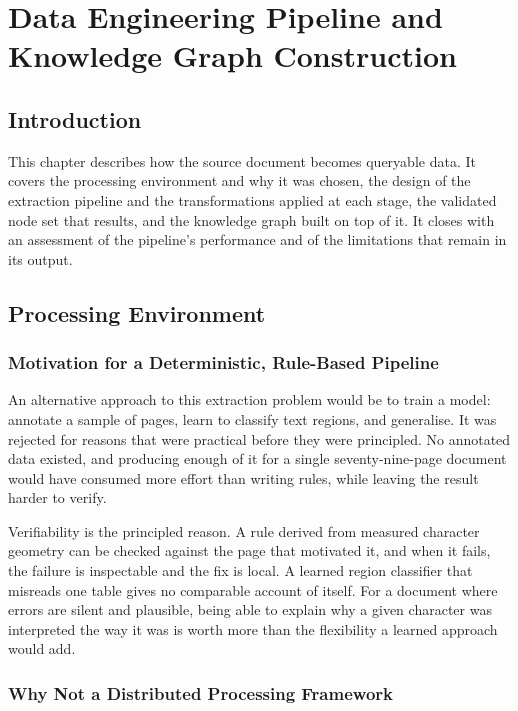 \chapter{Data Engineering Pipeline and Knowledge Graph Construction}
\minitoc

\section*{Introduction}

This chapter describes how the source document becomes queryable data. It covers the processing environment and why it was chosen, the design of the extraction pipeline and the transformations applied at each stage, the validated node set that results, and the knowledge graph built on top of it. It closes with an assessment of the pipeline's performance and of the limitations that remain in its output.

\section{Processing Environment}

\subsection{Motivation for a Deterministic, Rule-Based Pipeline}

An alternative approach to this extraction problem would be to train a model: annotate a sample of pages, learn to classify text regions, and generalise. It was rejected for reasons that were practical before they were principled. No annotated data existed, and producing enough of it for a single seventy-nine-page document would have consumed more effort than writing rules, while leaving the result harder to verify.

Verifiability is the principled reason. A rule derived from measured character geometry can be checked against the page that motivated it, and when it fails, the failure is inspectable and the fix is local. A learned region classifier that misreads one table gives no comparable account of itself. For a document where errors are silent and plausible, being able to explain why a given character was interpreted the way it was is worth more than the flexibility a learned approach would add.

\subsection{Why Not a Distributed Processing Framework}

